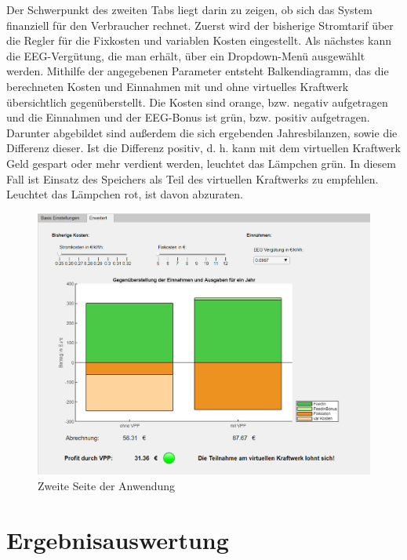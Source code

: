 Der Schwerpunkt des zweiten Tabs liegt darin zu zeigen, ob sich das System finanziell für den Verbraucher rechnet. Zuerst wird der bisherige Stromtarif über die Regler für die Fixkosten und variablen Kosten eingestellt. Als nächstes kann die EEG-Vergütung, die man erhält, über ein Dropdown-Menü ausgewählt werden. Mithilfe der angegebenen Parameter entsteht Balkendiagramm, das die berechneten Kosten und Einnahmen mit und ohne virtuelles Kraftwerk übersichtlich gegenüberstellt. Die Kosten sind orange, bzw. negativ aufgetragen und die Einnahmen und der EEG-Bonus ist grün, bzw. positiv aufgetragen.  Darunter abgebildet sind außerdem die sich ergebenden Jahresbilanzen, sowie die Differenz dieser. Ist die Differenz positiv, d. h. kann mit dem virtuellen Kraftwerk Geld gespart oder mehr verdient werden, leuchtet das Lämpchen grün. In diesem Fall ist Einsatz des Speichers als Teil des virtuellen Kraftwerks zu empfehlen. Leuchtet das Lämpchen rot, ist davon abzuraten.
\begin{figure}[H]
	\begin{center}
		\includegraphics[width=\textwidth]{Bilder/N_ScreenshotApp2.png}
		\caption{Zweite Seite der Anwendung}
		\label{fig:app2}
	\end{center}
\end{figure}



\section{Ergebnisauswertung}

